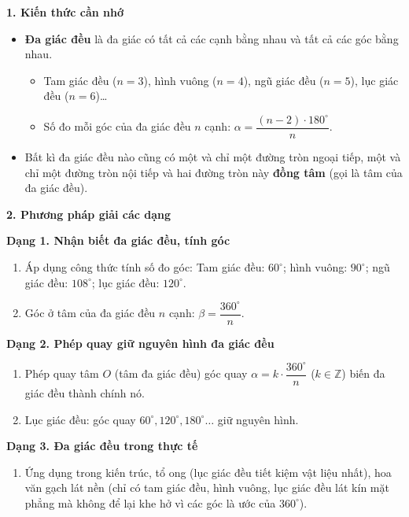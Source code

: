 \textbf{1. Kiến thức cần nhớ}
\begin{itemize}
\item \textbf{Đa giác đều} là đa giác có tất cả các cạnh bằng nhau và tất cả các góc bằng nhau.
\begin{itemize}
\item Tam giác đều ($n = 3$), hình vuông ($n = 4$), ngũ giác đều ($n = 5$), lục giác đều ($n = 6$)\dots
\item Số đo mỗi góc của đa giác đều $n$ cạnh: $\boxed{\alpha = \dfrac{(n - 2) \cdot 180^\circ}{n}}$.
\end{itemize}
\item Bất kì đa giác đều nào cũng có một và chỉ một đường tròn ngoại tiếp, một và chỉ một đường tròn nội tiếp và hai đường tròn này \textbf{đồng tâm} (gọi là tâm của đa giác đều).
\end{itemize}

\textbf{2. Phương pháp giải các dạng}

\textbf{Dạng 1. Nhận biết đa giác đều, tính góc}
\begin{enumerate}
\item Áp dụng công thức tính số đo góc: Tam giác đều: $60^\circ$; hình vuông: $90^\circ$; ngũ giác đều: $108^\circ$; lục giác đều: $120^\circ$.
\item Góc ở tâm của đa giác đều $n$ cạnh: $\boxed{\beta = \dfrac{360^\circ}{n}}$.
\end{enumerate}

\textbf{Dạng 2. Phép quay giữ nguyên hình đa giác đều}
\begin{enumerate}
\item Phép quay tâm $O$ (tâm đa giác đều) góc quay $\alpha = k \cdot \dfrac{360^\circ}{n}$ ($k \in \mathbb{Z}$) biến đa giác đều thành chính nó.
\item Lục giác đều: góc quay $60^\circ, 120^\circ, 180^\circ\dots$ giữ nguyên hình.
\end{enumerate}

\textbf{Dạng 3. Đa giác đều trong thực tế}
\begin{enumerate}
\item Ứng dụng trong kiến trúc, tổ ong (lục giác đều tiết kiệm vật liệu nhất), hoa văn gạch lát nền (chỉ có tam giác đều, hình vuông, lục giác đều lát kín mặt phẳng mà không để lại khe hở vì các góc là ước của $360^\circ$).
\end{enumerate}
